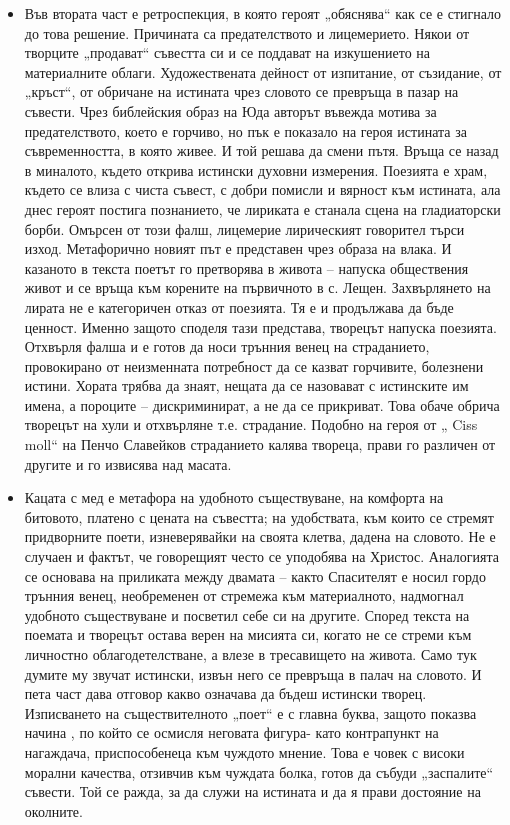 \documentclass[12pt,a4paper]{article}
\begin{document}
\begin{itemize}[leftmargin=*]
\vspace{-0.6cm}
\item Във втората част е ретроспекция, в която героят „обяснява“ как се е стигнало до това решение. Причината са предателството и лицемерието. Някои от творците „продават“ съвестта си и се поддават на изкушението на материалните облаги. Художествената дейност от изпитание, от съзидание, от „кръст“, от обричане на истината чрез словото се превръща в пазар на съвести. Чрез библейския образ на Юда авторът въвежда мотива за предателството, което е горчиво, но пък е показало на героя истината за съвременността, в която живее. И той решава да смени пътя. Връща се назад в миналото, където открива истински духовни измерения. Поезията е храм, където се влиза с чиста съвест, с добри помисли и вярност към истината, ала днес героят постига познанието, че лириката е станала сцена на гладиаторски борби. Омърсен от този фалш, лицемерие лирическият говорител търси изход. Метафорично новият път е представен чрез образа на влака. И казаното в текста поетът го претворява в живота – напуска обществения живот и се връща към корените на първичното в с. Лещен. Захвърлянето на лирата не е категоричен отказ от поезията. Тя е и продължава да бъде ценност. Именно защото споделя тази представа, творецът напуска поезията.
Отхвърля фалша и е готов да носи трънния венец на страданието, провокирано от неизменната потребност да се казват горчивите, болезнени истини. Хората трябва да знаят, нещата да се назовават с истинските им имена, а пороците – дискриминират, а не да се прикриват. Това обаче обрича творецът на хули и отхвърляне т.е. страдание.    Подобно на героя от „ Ciss moll“ на Пенчо Славейков страданието калява твореца, прави го различен от другите и го извисява над масата. 
\end{itemize}

\begin{itemize}[leftmargin=*]
\vspace{-0.6cm}
\item Кацата с мед е метафора на удобното съществуване, на комфорта на битовото, платено с цената на съвестта; на удобствата, към които се стремят придворните поети, изневерявайки на своята клетва, дадена на словото. Не е случаен и фактът, че говорещият често се уподобява на Христос. Аналогията се основава на приликата между двамата – както Спасителят е носил гордо трънния венец, необременен от стремежа към материалното, надмогнал удобното съществуване и посветил себе си на другите. Според текста на поемата и творецът остава верен на мисията си, когато не се стреми към личностно облагодетелстване, а влезе в тресавището на живота. Само тук думите му звучат истински, извън него се превръща в палач на словото.
И пета част дава отговор какво означава да бъдеш истински творец. Изписването на съществителното „поет“ е с главна буква, защото показва начина , по който се осмисля неговата фигура- като контрапункт на нагаждача, приспособенеца към чуждото мнение. Това е човек с високи морални качества, отзивчив към чуждата болка, готов да събуди „заспалите“ съвести. Той се ражда, за да служи на истината и да я прави достояние на околните.
\end{itemize}
\end{document}
